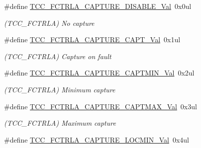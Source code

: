 \begin{DoxyCompactItemize}
\item 
\hypertarget{group___s_a_m_l21___t_c_c_gad31b55c84d21b43b9ef58769281b6c38}{}\#define \hyperlink{group___s_a_m_l21___t_c_c_gad31b55c84d21b43b9ef58769281b6c38}{T\+C\+C\+\_\+\+F\+C\+T\+R\+L\+A\+\_\+\+C\+A\+P\+T\+U\+R\+E\+\_\+\+D\+I\+S\+A\+B\+L\+E\+\_\+\+Val}~0x0ul\label{group___s_a_m_l21___t_c_c_gad31b55c84d21b43b9ef58769281b6c38}

\begin{DoxyCompactList}\small\item\em (T\+C\+C\+\_\+\+F\+C\+T\+R\+L\+A) No capture \end{DoxyCompactList}\item 
\hypertarget{group___s_a_m_l21___t_c_c_gae9ce0184c28ab59a89bcdd379cf3b7a6}{}\#define \hyperlink{group___s_a_m_l21___t_c_c_gae9ce0184c28ab59a89bcdd379cf3b7a6}{T\+C\+C\+\_\+\+F\+C\+T\+R\+L\+A\+\_\+\+C\+A\+P\+T\+U\+R\+E\+\_\+\+C\+A\+P\+T\+\_\+\+Val}~0x1ul\label{group___s_a_m_l21___t_c_c_gae9ce0184c28ab59a89bcdd379cf3b7a6}

\begin{DoxyCompactList}\small\item\em (T\+C\+C\+\_\+\+F\+C\+T\+R\+L\+A) Capture on fault \end{DoxyCompactList}\item 
\hypertarget{group___s_a_m_l21___t_c_c_ga43bccd1a8e1e39804161e2047b5b5784}{}\#define \hyperlink{group___s_a_m_l21___t_c_c_ga43bccd1a8e1e39804161e2047b5b5784}{T\+C\+C\+\_\+\+F\+C\+T\+R\+L\+A\+\_\+\+C\+A\+P\+T\+U\+R\+E\+\_\+\+C\+A\+P\+T\+M\+I\+N\+\_\+\+Val}~0x2ul\label{group___s_a_m_l21___t_c_c_ga43bccd1a8e1e39804161e2047b5b5784}

\begin{DoxyCompactList}\small\item\em (T\+C\+C\+\_\+\+F\+C\+T\+R\+L\+A) Minimum capture \end{DoxyCompactList}\item 
\hypertarget{group___s_a_m_l21___t_c_c_ga2e9b52ae43bcd0bc50ecb8176ac4a9e7}{}\#define \hyperlink{group___s_a_m_l21___t_c_c_ga2e9b52ae43bcd0bc50ecb8176ac4a9e7}{T\+C\+C\+\_\+\+F\+C\+T\+R\+L\+A\+\_\+\+C\+A\+P\+T\+U\+R\+E\+\_\+\+C\+A\+P\+T\+M\+A\+X\+\_\+\+Val}~0x3ul\label{group___s_a_m_l21___t_c_c_ga2e9b52ae43bcd0bc50ecb8176ac4a9e7}

\begin{DoxyCompactList}\small\item\em (T\+C\+C\+\_\+\+F\+C\+T\+R\+L\+A) Maximum capture \end{DoxyCompactList}\item 
\hypertarget{group___s_a_m_l21___t_c_c_ga7986fbe253b4d48fb4843d36dcea0102}{}\#define \hyperlink{group___s_a_m_l21___t_c_c_ga7986fbe253b4d48fb4843d36dcea0102}{T\+C\+C\+\_\+\+F\+C\+T\+R\+L\+A\+\_\+\+C\+A\+P\+T\+U\+R\+E\+\_\+\+L\+O\+C\+M\+I\+N\+\_\+\+Val}~0x4ul\label{group___s_a_m_l21___t_c_c_ga7986fbe253b4d48fb4843d36dcea0102}


\end{DoxyCompactItemize}

